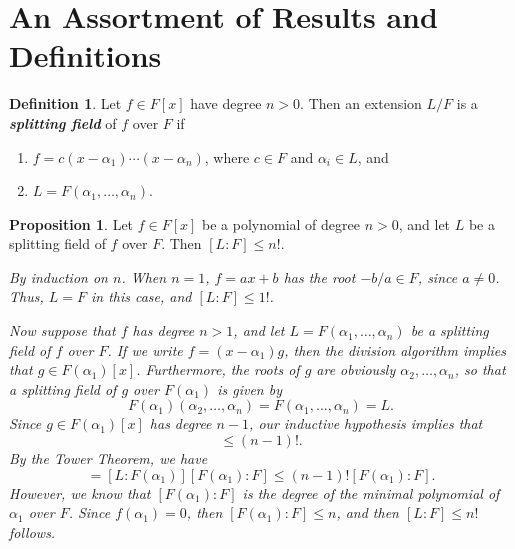 \documentclass{article}
\makeatletter
\theoremstyle{definition}
\newtheorem{prop}{Proposition}
\newtheorem{definition}{Definition}
\theoremstyle{remark}
\let\oldproofname=\proofname
\renewcommand{\proofname}{\bf{\textit{\oldproofname}}}
\theoremstyle{definition}
\renewenvironment{proof}[1][\proofname]{\par
  \pushQED{\qed}%
  \normalfont \topsep6\p@\@plus6\p@\relax
  \list{}{\leftmargin=0mm
          \rightmargin=0mm
          \settowidth{\itemindent}{\itshape#1}%
          \labelwidth=4mm
          \parsep=0pt \listparindent=0mm%
  }
  \item[\hskip\labelsep
        \itshape
    #1\@addpunct{.}]\ignorespaces
}{%
  \popQED\endlist\@endpefalse
}
\makeatother
\begin{document}
\section{An Assortment of Results and Definitions}\hline\hfill\par
    \begin{definition}\label{def:1}
        Let $f\in F[x]$ have degree $n>0$. Then an extension $L/F$ is a \textbf{\textit{splitting field}} of $f$ over $F$ if
            \begin{enumerate}
                \item $f=c(x-\alpha_1)\cdots(x-\alpha_n)$, where $c\in F$ and $\alpha_i\in L$, and
                \item $L=F(\alpha_1,\dots,\alpha_n)$.
            \end{enumerate}
    \end{definition}
    \begin{prop}\label{prop:1}
        Let $f\in F[x]$ be a polynomial of degree $n>0$, and let $L$ be a splitting field of $f$ over $F$. Then $[L\colon F]\leq n!$.
    \end{prop}
        \begin{proof}
            \emph{By induction on $n$. When $n=1$, $f=ax+b$ has the root $-b/a\in F$, since $a\neq 0$. Thus, $L=F$ in this case, and $[L\colon F]\leq 1!$.}\par\hspace{4mm}\emph{Now suppose that $f$ has degree $n>1$, and let $L=F(\alpha_1,\dots, \alpha_n)$ be a splitting field of $f$ over $F$. If we write $f=(x-\alpha_1)g$, then the division algorithm implies that $g\in F(\alpha_1)[x]$. Furthermore, the roots of $g$ are obviously $\alpha_2,\dots,\alpha_n$, so that a splitting field of $g$ over $F(\alpha_1)$ is given by}
                \begin{equation*}
                    F(\alpha_1)(\alpha_2,\dots,\alpha_n)=F(\alpha_1,\dots,\alpha_n)=L.
                \end{equation*}
            \emph{Since $g\in F(\alpha_1)[x]$ has degree $n-1$, our inductive hypothesis implies that}
                \begin{equation*}
                    [L\colon F(\alpha_1)]\leq (n-1)!.
                \end{equation*}
            \emph{By the Tower Theorem, we have}
                \begin{equation*}
                    [L\colon F]=[L\colon F(\alpha_1)][F(\alpha_1)\colon F]\leq (n-1)![F(\alpha_1)\colon F].
                \end{equation*}
            \emph{However, we know that $[F(\alpha_1)\colon F]$ is the degree of the minimal polynomial of $\alpha_1$ over $F$. Since $f(\alpha_1)=0$, then $[F(\alpha_1)\colon F]\leq n$, and then $[L\colon F]\leq n!$ follows.} 
        \end{proof}
\end{document}
